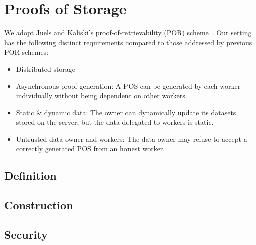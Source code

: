 \section{Proofs of Storage} \label{sect:pos}

We adopt Juels and Kaliski's proof-of-retrievability (POR) scheme~\cite{JK07}.
Our setting has the following distinct requirements compared to those addressed by previous POR schemes:
\begin{itemize}
 \item Distributed storage
 \item Asynchronous proof generation: A POS can be generated by each worker individually without being dependent on other workers.
 \item Static \& dynamic data: The owner can dynamically update its datasets stored on the server, but the data delegated to workers is static.
 \item Untrusted data owner and workers: The data owner may refuse to accept a correctly generated POS from an honest worker.
\end{itemize}



\subsection{Definition} \label{sect:pos-definition}

\subsection{Construction} \label{sect:pos-construction}

\subsection{Security} \label{sect:security}